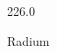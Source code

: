 \documentclass[12pt]{article}
\begin{document}
\hfill{}
\vfill
\begin{center}
  {\fontsize{50}{60}
  }

  226.0

Radium
\end{center}
\vfill
\end{document}
